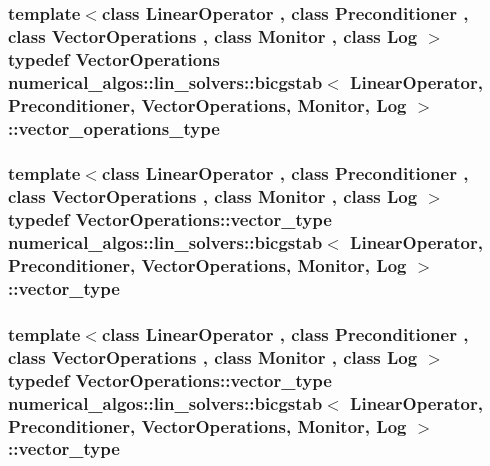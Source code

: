\hypertarget{classnumerical__algos_1_1lin__solvers_1_1bicgstab_a6ff5c085063b744de8b72fd42bd45f33}{
\subsubsection[{vector\-\_\-operations\-\_\-type}]{\setlength{\rightskip}{0pt plus 5cm}template$<$class Linear\-Operator , class Preconditioner , class Vector\-Operations , class Monitor , class Log $>$ typedef Vector\-Operations {\bf numerical\-\_\-algos\-::lin\-\_\-solvers\-::bicgstab}$<$ Linear\-Operator, Preconditioner, Vector\-Operations, Monitor, Log $>$\-::{\bf vector\-\_\-operations\-\_\-type}}}\label{classnumerical__algos_1_1lin__solvers_1_1bicgstab_a6ff5c085063b744de8b72fd42bd45f33}
\hypertarget{classnumerical__algos_1_1lin__solvers_1_1bicgstab_a3525de8fe1598864ceac98c83bd0d477}{
\subsubsection[{vector\-\_\-type}]{\setlength{\rightskip}{0pt plus 5cm}template$<$class Linear\-Operator , class Preconditioner , class Vector\-Operations , class Monitor , class Log $>$ typedef Vector\-Operations\-::vector\-\_\-type {\bf numerical\-\_\-algos\-::lin\-\_\-solvers\-::bicgstab}$<$ Linear\-Operator, Preconditioner, Vector\-Operations, Monitor, Log $>$\-::{\bf vector\-\_\-type}}}\label{classnumerical__algos_1_1lin__solvers_1_1bicgstab_a3525de8fe1598864ceac98c83bd0d477}
\hypertarget{classnumerical__algos_1_1lin__solvers_1_1bicgstab_a3525de8fe1598864ceac98c83bd0d477}{
\subsubsection[{vector\-\_\-type}]{\setlength{\rightskip}{0pt plus 5cm}template$<$class Linear\-Operator , class Preconditioner , class Vector\-Operations , class Monitor , class Log $>$ typedef Vector\-Operations\-::vector\-\_\-type {\bf numerical\-\_\-algos\-::lin\-\_\-solvers\-::bicgstab}$<$ Linear\-Operator, Preconditioner, Vector\-Operations, Monitor, Log $>$\-::{\bf vector\-\_\-type}}}\label{classnumerical__algos_1_1lin__solvers_1_1bicgstab_a3525de8fe1598864ceac98c83bd0d477}


